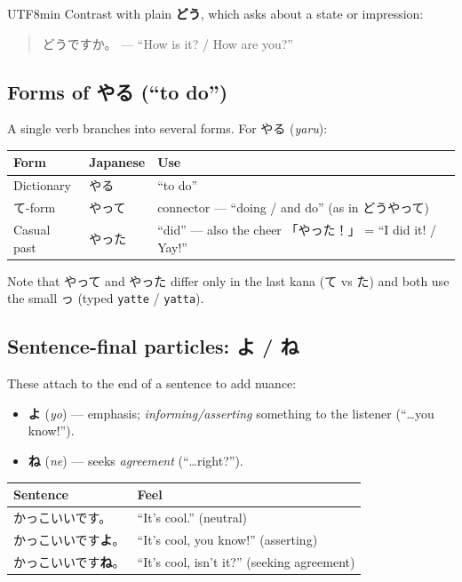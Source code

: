 \documentclass[11pt]{article}
\begin{document}
\begin{CJK}{UTF8}{min}
Contrast with plain \textbf{どう}, which asks about a state or impression:
\begin{quote}
どうですか。 --- ``How is it? / How are you?''
\end{quote}

\subsection{Forms of \texorpdfstring{やる}{yaru} (``to do'')}
A single verb branches into several forms. For やる (\emph{yaru}):
\begin{center}
\begin{tabular}{@{}lll@{}}
\toprule
Form & Japanese & Use \\
\midrule
Dictionary  & やる   & ``to do'' \\
て-form      & やって & connector --- ``doing / and do'' (as in どうやって) \\
Casual past & やった & ``did'' --- also the cheer 「やった！」 = ``I did it! / Yay!'' \\
\bottomrule
\end{tabular}
\end{center}
Note that やって and やった differ only in the last kana (て vs た) and both
use the small っ (typed \texttt{yatte} / \texttt{yatta}).

\subsection{Sentence-final particles: \texorpdfstring{よ}{yo} / \texorpdfstring{ね}{ne}}
These attach to the end of a sentence to add nuance:
\begin{itemize}
  \item \textbf{よ} (\emph{yo}) --- emphasis; \emph{informing/asserting} something
        to the listener (``\ldots you know!'').
  \item \textbf{ね} (\emph{ne}) --- seeks \emph{agreement} (``\ldots right?'').
\end{itemize}
\begin{center}
\begin{tabular}{@{}ll@{}}
\toprule
Sentence & Feel \\
\midrule
かっこいいです。   & ``It's cool.'' (neutral) \\
かっこいいです\textbf{よ}。 & ``It's cool, you know!'' (asserting) \\
かっこいいです\textbf{ね}。 & ``It's cool, isn't it?'' (seeking agreement) \\
\bottomrule
\end{tabular}
\end{center}


\end{CJK}
\end{document}
